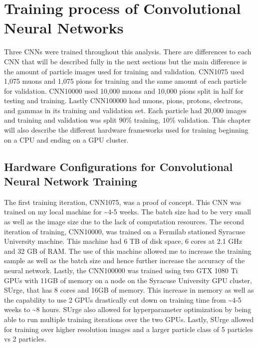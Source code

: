 \chapter{Training process of Convolutional Neural Networks}\label{ch:cnn_train}
Three CNNs were trained throughout this analysis. There are differences to each CNN that will be described fully in the next sections but the main difference is the amount of particle images used for training and validation. CNN1075 used 1,075 muons and 1,075 pions for training and the same amount of each particle for validation. CNN10000 used 10,000 muons and 10,000 pions split in half for testing and training. Lastly CNN100000 had muons, pions, protons, electrons, and gammas in its training and validation set. Each particle had 20,000 images and training and validation was split $90\%$ training, $10\%$ validation. This chapter will also describe the different hardware frameworks used for training beginning on a CPU and ending on a GPU cluster. 




\section{Hardware Configurations for Convolutional Neural Network Training}\label{research approach}
The first training iteration, CNN1075, was a proof of concept. This CNN was trained on my local machine for \sim 4-5 weeks. The batch size had to be very small as well as the image size due to the lack of computation resources. The second iteration of training, CNN10000, was trained on a Fermilab stationed Syracuse University machine. This machine had 6 TB of disk space, 6 cores at 2.1 GHz and 32 GB of RAM. The use of this machine allowed me to increase the training sample as well as the batch size and hence further increase the accuracy of the neural network. Lastly, the CNN100000 was trained using two GTX 1080 Ti GPUs with 11GB of memory on a node on the Syracuse University GPU cluster, SUrge, that has 8 cores and 16GB of memory. This increase in memory as well as the capability to use 2 GPUs drastically cut down on training time from \sim 4-5 weeks to \sim 8 hours. SUrge also allowed for hyperparameter optimization by being able to run multiple training iterations over the two GPUs. Lastly, SUrge allowed for training over higher resolution images and a larger particle class of 5 particles vs 2 particles. 

